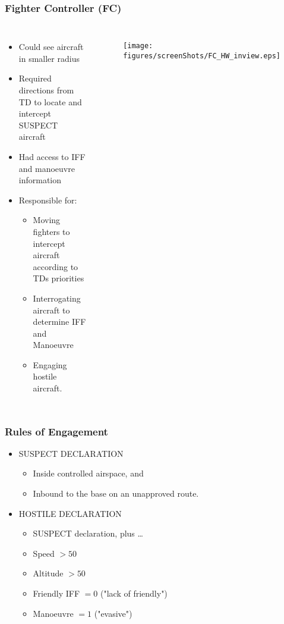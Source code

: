 \documentclass[aspectratio=43, notes]{beamer}
\begin{document}
\begin{frame}
\frametitle{Fighter Controller (FC)}
\small
\begin{columns}
\begin{itemize}[label=$\bullet$]
	\item Could see aircraft in smaller radius
	\item Required directions from TD to locate and intercept SUSPECT aircraft
	\item Had access to IFF and manoeuvre information
	\item Responsible for:
	\begin{itemize}[label=$\bullet$]
		\item Moving fighters to intercept aircraft according to TDs priorities
		\item Interrogating aircraft to determine IFF and Manoeuvre
		\item Engaging hostile aircraft. 
	\end{itemize}
\end{itemize}
\begin{figure}[h]
	\begin{center}
		\texttt{[image: figures/screenShots/FC\_HW\_inview.eps]}\\
	\end{center}
\end{figure}
\end{columns}
\end{frame}


\begin{frame}
\frametitle{Rules of Engagement}
\begin{itemize}	
	\item SUSPECT DECLARATION
	\begin{itemize}[label=$\bullet$]
		\item Inside controlled airspace, and 
		\item Inbound to the base on an unapproved route. 
	\end{itemize}
	\item HOSTILE DECLARATION	
	\begin{itemize}[label=$\bullet$]
		\item SUSPECT declaration, plus \ldots
		\item Speed $>50$
		\item Altitude $>50$
		\item Friendly IFF $= 0$ ("lack of friendly")
		\item Manoeuvre $= 1$ ("evasive")
	\end{itemize}
\end{itemize}
\end{frame}
\end{document}
